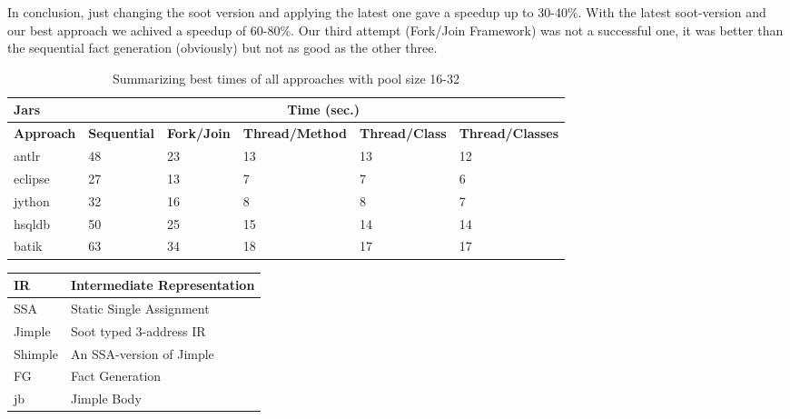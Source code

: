 \documentclass{dithesis}
\begin{document}
    In conclusion, just changing the soot version and applying the latest one gave a speedup up to 30-40\%. With the latest soot-version and our best approach we achived a speedup of 60-80\%. Our third attempt (Fork/Join Framework) was not a successful one, it was better than the sequential fact generation (obviously) but not as good as the other three.

    \begin{table}[H]
    \centering
    \begin{tabular}{@{}l|lllll@{}}
    \toprule
    \textbf{Jars}     & \multicolumn{5}{c}{\textbf{Time (sec.)}}                                                                           \\ \midrule
    \textbf{Approach} & \textbf{Sequential} & \textbf{Fork/Join} & \textbf{Thread/Method} & \textbf{Thread/Class} & \textbf{Thread/Classes} \\ \midrule
    antlr             & 48                  & 23                 & 13                     & 13                    & 12                      \\
    eclipse           & 27                  & 13                 & 7                      & 7                     & 6                       \\
    jython            & 32                  & 16                 & 8                      & 8                     & 7                       \\
    hsqldb            & 50                  & 25                 & 15                     & 14                    & 14                      \\
    batik             & 63                  & 34                 & 18                     & 17                    & 17                      \\ \bottomrule
    \end{tabular}
    \newline
    \caption{Summarizing best times of all approaches with pool size 16-32}
    \end{table}






\begin{thesisabbreviations}
	\begin{tabularx}{\textwidth}{|X|X|}
        \hline
        IR & Intermediate Representation \\
        \hline
        SSA & Static Single Assignment \\
        \hline
        Jimple & Soot typed 3-address IR \\
        \hline
        Shimple & An SSA-version of Jimple \\
        \hline
        FG & Fact Generation \\
        \hline
        jb & Jimple Body \\
		\hline
	\end{tabularx}
\end{thesisabbreviations}
\end{document}
